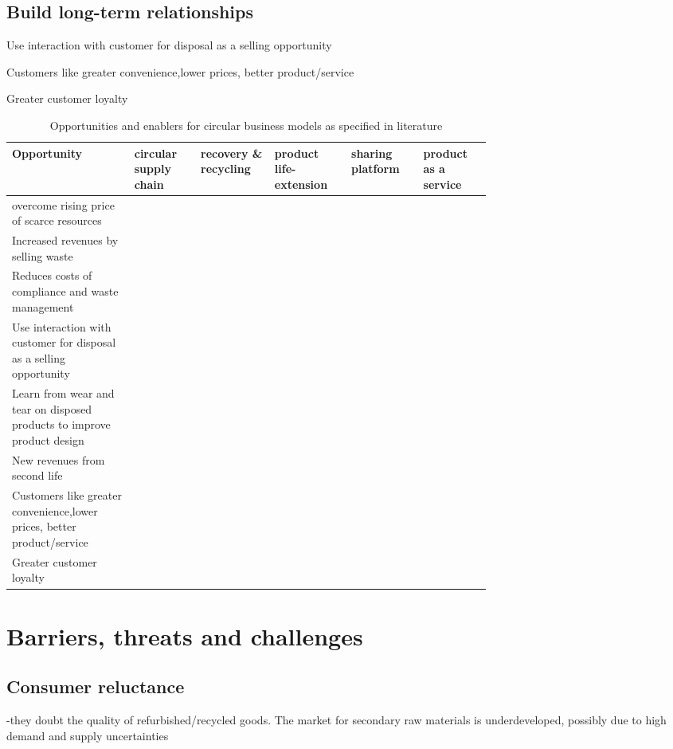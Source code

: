 \documentclass[a4paper,man,10pt]{apa6}
\begin{document}
\subsection{Build long-term relationships}\label{subsec:relationships}
Use interaction with customer for disposal as a selling opportunity

Customers like greater convenience,lower prices, better product/service

Greater customer loyalty


\begin{table} \tiny \centering
\begin{tabular}{p{0.2\linewidth}|p{0.1\linewidth} p{0.1\linewidth} p{0.1\linewidth} p{0.1\linewidth} p{0.1 \linewidth}}
Opportunity & circular supply chain &recovery \& recycling& product life-extension& sharing platform& product as a service \\\hline
overcome rising price of scarce resources & \cite{Lacy2015} &\cite{Lacy2015} & & &\\
Increased revenues by selling waste & &\cite{Lacy2015}  & & &\\
Reduces costs of compliance and waste management& &\cite{Lacy2015}  & & &\\
Use interaction with customer for disposal as a selling opportunity& &\cite{Lacy2015}  & & &\\
Learn from wear and tear on disposed products to improve product design& &\cite{Lacy2015}  & & &\\
New revenues from second life&& &\cite{Lacy2015}  & &\\
Customers like greater convenience,lower prices, better product/service&& &&\cite{Lacy2015}  &\\
Greater customer loyalty&& &&&\cite{Lacy2015}  \\

\hline
\end{tabular}\caption{Opportunities and enablers for circular business models as specified in literature}\label{tab:opportunities}
\end{table}

\section{Barriers, threats and challenges}\label{sec:barriers}

\subsection{Consumer reluctance}\label{subsec:Reluctance}
-they doubt the quality of refurbished/recycled goods. The market for secondary raw materials is underdeveloped, possibly due to high demand and supply uncertainties
\end{document}
